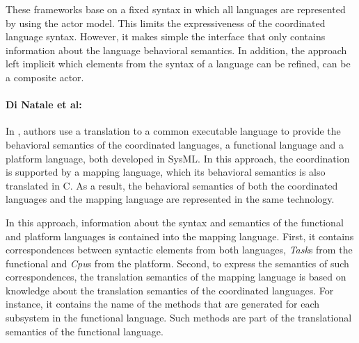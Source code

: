 These frameworks base on a fixed syntax in which all languages are represented by using the actor model. This limits the expressiveness of the coordinated language syntax. However, it makes simple the interface that only contains information about the language behavioral semantics. In addition, the approach left implicit which elements from the syntax of a language can be refined, \ie can be a composite actor.   

     

 	


\paragraph{Di Natale et al: }
In \cite{dinatale}, authors use a translation to a common executable language to provide the behavioral semantics of the coordinated languages, \ie a functional language and a platform language, both developed in SysML. In this approach, the coordination is supported by a mapping language, which its behavioral semantics is also translated in C. As a result, the behavioral semantics of both the coordinated languages and the mapping language are represented in the same technology.

In this approach, information about the syntax and semantics of the functional and platform languages is contained into the mapping language. First, it contains correspondences between syntactic elements from both languages, \eg \emph{Task}s from the functional and \emph{Cpu}s from the platform. Second, to express the semantics of such correspondences, the translation semantics of the mapping language is based on knowledge about the translation semantics of the coordinated languages. For instance, it contains the name of the methods that are generated for each subsystem in the functional language. Such methods are part of the translational semantics of the functional language. 


